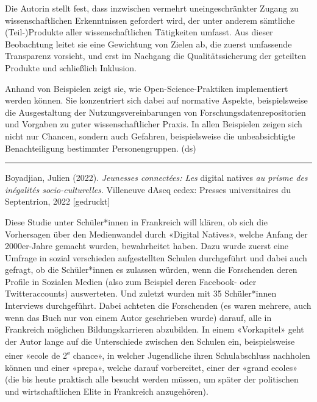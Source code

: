 \documentclass[a4paper,
fontsize=11pt,
oneside,
numbers=noperiodatend,
parskip=half-,
bibliography=totoc,
final
]{scrartcl}
\begin{document}
Die Autorin stellt fest, dass inzwischen vermehrt uneingeschränkter
Zugang zu wissenschaftlichen Erkenntnissen gefordert wird, der unter
anderem sämtliche (Teil-)Produkte aller wissenschaftlichen Tätigkeiten
umfasst. Aus dieser Beobachtung leitet sie eine Gewichtung von Zielen
ab, die zuerst umfassende Transparenz vorsieht, und erst im Nachgang die
Qualitätssicherung der geteilten Produkte und schließlich Inklusion.

Anhand von Beispielen zeigt sie, wie Open-Science-Praktiken
implementiert werden können. Sie konzentriert sich dabei auf normative
Aspekte, beispielsweise die Ausgestaltung der Nutzungsvereinbarungen von
Forschungsdatenrepositorien und Vorgaben zu guter wissenschaftlicher
Praxis. In allen Beispielen zeigen sich nicht nur Chancen, sondern auch
Gefahren, beispielsweise die unbeabsichtigte Benachteiligung bestimmter
Personengruppen. (ds)

\begin{center}\rule{0.5\linewidth}{0.5pt}\end{center}

Boyadjian, Julien (2022). \emph{Jeunesses connectées: Les} digital
natives \emph{au prisme des inégalités socio-culturelles}. Villeneuve
d\textquotesingle Ascq cedex: Presses universitaires du Septentrion,
2022 {[}gedruckt{]}

Diese Studie unter Schüler*innen in Frankreich will klären, ob sich die
Vorhersagen über den Medienwandel durch «Digital Natives», welche Anfang
der 2000er-Jahre gemacht wurden, bewahrheitet haben. Dazu wurde zuerst
eine Umfrage in sozial verschieden aufgestellten Schulen durchgeführt
und dabei auch gefragt, ob die Schüler*innen es zulassen würden, wenn
die Forschenden deren Profile in Sozialen Medien (also zum Beispiel
deren Facebook- oder Twitteraccounts) auswerteten. Und zuletzt wurden
mit 35 Schüler*innen Interviews durchgeführt. Dabei achteten die
Forschenden (es waren mehrere, auch wenn das Buch nur von einem Autor
geschrieben wurde) darauf, alle in Frankreich möglichen
Bildungskarrieren abzubilden. In einem «Vorkapitel» geht der Autor lange
auf die Unterschiede zwischen den Schulen ein, beispielsweise einer
«ecole de 2\textsuperscript{e} chance», in welcher Jugendliche ihren
Schulabschluss nachholen können und einer «prepa», welche darauf
vorbereitet, einer der «grand ecoles» (die bis heute praktisch alle
besucht werden müssen, um später der politischen und wirtschaftlichen
Elite in Frankreich anzugehören).
\end{document}
